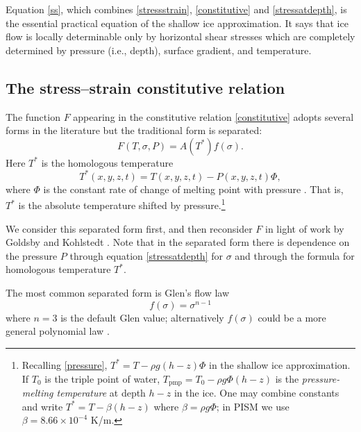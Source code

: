 \documentclass[12pt,final]{amsart}%
\theoremstyle{plain}
\theoremstyle{definition}
\theoremstyle{remark}
\newcommand{\Tpmp}{T_{\text{pmp}}}
\begin{document}
Equation \eqref{ss}, which combines \eqref{stressstrain}, \eqref{constitutive} and \eqref{stressatdepth}, is the essential practical equation of the shallow ice approximation.  It says that ice flow is locally determinable only by horizontal shear stresses which are completely determined by pressure (i.e., depth), surface gradient, and temperature.


\subsection*{The stress--strain constitutive relation}\label{Fsubsect}  The function $F$ appearing in the constitutive relation \eqref{constitutive} adopts several forms in the literature but the traditional form is separated:
\begin{equation}\label{tradF}
F(T,\sigma,P)=A(T^*) f(\sigma).
\end{equation}
Here $T^*$ is the homologous temperature
    $$T^*(x,y,z,t) = T(x,y,z,t) - P(x,y,z,t) \Phi,$$
where $\Phi$ is the constant rate of change of melting point with pressure \citep{PayneBaldwin}.  That is, $T^*$ is the absolute temperature shifted by pressure.\footnote{Recalling \eqref{pressure}, $T^*=T-\rho g (h-z) \Phi$ in the shallow ice approximation.  If $T_0$ is the triple point of water, $\Tpmp = T_0 - \rho g \Phi (h-z)$ is the \emph{pressure-melting temperature} at depth $h-z$ in the ice. One may combine constants and write $T^* = T - \beta (h-z)$ where $\beta = \rho g \Phi$; in PISM we use $\beta = 8.66\times 10^{-4}$ K/m.}

We consider this separated form first, and then reconsider $F$ in light of work by Goldsby and Kohlstedt \citep{GoldsbyKohlstedt}.  Note that in the separated form there is dependence on the pressure $P$ through equation \eqref{stressatdepth} for $\sigma$ and through the formula for homologous temperature $T^*$.

The most common separated form is Glen's flow law \citep{Glen}
    $$f(\sigma)=\sigma^{n-1}$$
where $n=3$ is the default Glen value; alternatively $f(\sigma)$ could be a more general polynomial law \citep{Hutter93}.
\end{document}
